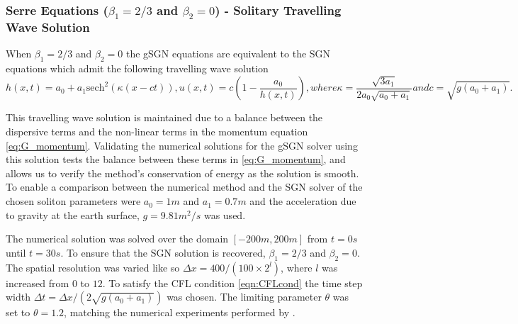 \documentclass[10pt]{elsarticle}
\begin{document}
\subsubsection{Serre Equations ($\beta_1 = 2/3$ and $\beta_2 = 0$) - Solitary Travelling Wave Solution}
When $\beta_1 = 2/3$ and $\beta_2 = 0$ the gSGN equations are equivalent to the SGN equations which admit the following travelling wave solution \cite{El-etal-2006}
\begin{subequations}
	\begin{equation}
	h(x,t) = a_0 + a_1 \text{sech}^2\left( \kappa (x - ct) \right),
	\end{equation}
	\begin{equation}
	u(x,t) = c \left( 1- \dfrac{a_0}{h(x,t)} \right),
	\end{equation}
	where
	\begin{equation}
	\kappa = \dfrac{\sqrt{3a_1}}{2a_0 \sqrt{a_0 + a_1}}
	\end{equation}
	and
	\begin{equation}
	c = \sqrt{g\left(a_0 + a_1\right)}.
	\end{equation}
\end{subequations}

This travelling wave solution is maintained due to a balance between the dispersive terms and the non-linear terms in the momentum equation \eqref{eq:G_momentum}. Validating the numerical solutions for the gSGN solver using this solution tests the balance between these terms in \eqref{eq:G_momentum}, and allows us to verify the method's conservation of energy as the solution is smooth. To enable a comparison between the numerical method and the SGN solver of \citet{Zoppou-etal-2017} the chosen soliton parameters were $a_0 = 1m$ and $a_1 = 0.7m$ and the acceleration due to gravity at the earth surface, $g = 9.81 m^2/s$ was used.

The numerical solution was solved over the domain $\left[-200m,200m\right]$ from $t=0s$ until $t=30s$. To ensure that the SGN solution is recovered, $\beta_1 = 2/3$ and $\beta_2 = 0$. The spatial resolution was varied like so $\Delta x = 400 / (100 \times 2^{l})$, where $l$ was increased from $0$ to $12$. To satisfy the CFL condition \eqref{eqn:CFLcond} the time step width $\Delta t = \Delta x  / ( 2 \sqrt{g(a_0 + a_1)})$ \cite{Pitt-2019} was chosen. The limiting parameter $\theta$ was set to $\theta = 1.2$, matching the numerical experiments performed by \citet{Pitt-2019}.
\end{document}
